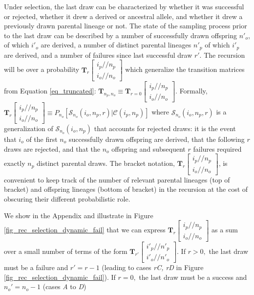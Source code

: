 \documentclass[review,nonatbib]{elsarticle}
\newcommand{\dslash}{/\!\!/}
\newcommand{\Coalc}[4]{\begin{bmatrix}#1\dslash #2 \\ #3\dslash #4 \end{bmatrix}}
\newcommand{\ms}{\mathcal{S}}
\begin{document}
Under selection, the last draw can be characterized by whether it was successful or rejected, whether it drew a
derived or ancestral allele, and whether it drew a previously drawn parental lineage or not.
The state of the sampling process prior to the last draw can be described by a number of successfully drawn
offspring $n'_o$, of which $i'_o$ are derived, a number of distinct parental lineages
$n'_p$ of which $i'_p$ are derived, and a number of failures since last successful draw $r'$.
The recursion will be over a probability $\mathbf{T}_{r}\Coalc{i_p}{n_p}{i_o}{n_o}$ which generalize the 
transition matrices from Equation \eqref{eq_truncated}: $\mathbf{T}_{n_p,n_o}\equiv \mathbf{T}_{r=0}\Coalc{i_p}{n_p}{i_o}{n_o}.$    
Formally,  $\mathbf{T}_{r}\Coalc{i_p}{n_p}{i_o}{n_o} \equiv P_{n_o}\left[\ms_{n_o}(i_o, n_p, r) | \mathcal{C}(i_p, n_p)\right]$ where
$\ms_{n_o}(i_o, n_p, r)$ is a generalization of  $\ms_{n_o}(i_o, n_p)$ that accounts for rejected draws: 
it is the event that $i_o$ of the
first $n_o$ successfully drawn offspring are derived, that the following $r$ draws are rejected, and
that the $n_o$ offspring and subsequent $r$ failures required exactly $n_p$ distinct parental draws.
The bracket notation, $\mathbf{T}_{r}\Coalc{i_p}{n_p}{i_o}{n_o}$, 
is convenient to keep track of the number of relevant parental lineages (top of bracket) and offspring lineages (bottom of bracket) 
in the recursion at the cost of obscuring their different probabilistic role.


We show in the Appendix and illustrate in Figure \ref{fig_rec_selection_dynamic_fail}  that we
can express $\mathbf{T}_{r}\Coalc{i_p}{n_p}{i_o}{n_o}$ as a sum over a small number of terms
of the form $\mathbf{T}_{r'}\Coalc{i'_p}{n'_p}{i'_o}{n'_o}.$ If $r>0,$ the last draw must be a failure
and $r' = r - 1$ (leading to cases \textit{rC, rD} in Figure \ref{fig_rec_selection_dynamic_fail}).
If $r=0,$ the last draw must be a success and $n_o' = n_o-1$ (cases \textit{A} to \textit{D})

\end{document}
